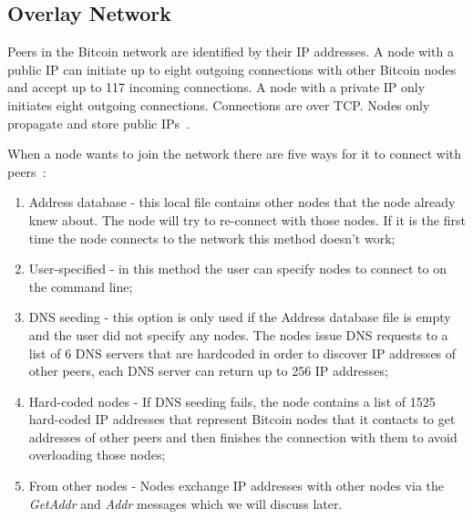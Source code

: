 

\subsection{Overlay Network}
\label{sec:p2pnetwork}

Peers in the Bitcoin network are identified by their IP addresses. A node with a public IP can initiate up to eight outgoing connections with other Bitcoin nodes and accept up to 117 incoming connections. A node with a private IP only initiates eight outgoing connections. Connections are over TCP. Nodes only propagate and store public IPs~\cite{heilman2015eclipse}.

When a node wants to join the network there are five ways for it to connect with peers~\cite{bitcoinwiki}:

\begin{enumerate}
	\item Address database - this local file contains other nodes that the node already knew about. The node will try to re-connect with those nodes. If it is the first time the node connects to the network this method doesn't work;
	\item User-specified - in this method the user can specify nodes to connect to on the command line;
	\item DNS seeding - this option is only used if the Address database file is empty and the user did not specify any nodes. The nodes issue DNS requests to a list of 6 DNS servers that are hardcoded in order to discover IP addresses of other peers, each DNS server can return up to 256 IP addresses;
	\item Hard-coded nodes - If DNS seeding fails, the node contains a list of 1525 hard-coded IP addresses that represent Bitcoin nodes that it contacts to get addresses of other peers and then finishes the connection with them to avoid overloading those nodes;
	\item From other nodes - Nodes exchange IP addresses with other nodes via the \textit{GetAddr} and \textit{Addr} messages which we will discuss later.
\end{enumerate}

